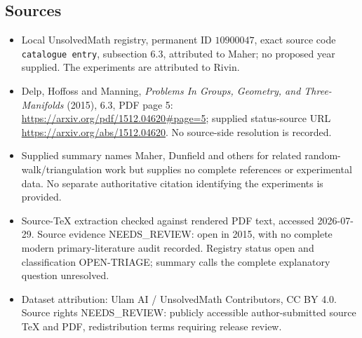 \documentclass[11pt]{article}
\begin{document}
\subsection{Sources}
\begin{itemize}
\item Local UnsolvedMath registry, permanent ID \(10900047\), exact source code \texttt{catalogue entry}, subsection 6.3, attributed to Maher; no proposed year supplied. The experiments are attributed to Rivin.
\item Delp, Hoffoss and Manning, \emph{Problems In Groups, Geometry, and Three-Manifolds} (2015), 6.3, PDF page 5: \url{https://arxiv.org/pdf/1512.04620#page=5}; supplied status-source URL \url{https://arxiv.org/abs/1512.04620}. No source-side resolution is recorded.
\item Supplied summary names Maher, Dunfield and others for related random-walk/triangulation work but supplies no complete references or experimental data. No separate authoritative citation identifying the experiments is provided.
\item Source-TeX extraction checked against rendered PDF text, accessed 2026-07-29. Source evidence NEEDS\_REVIEW: open in 2015, with no complete modern primary-literature audit recorded. Registry status open and classification OPEN-TRIAGE; summary calls the complete explanatory question unresolved.
\item Dataset attribution: Ulam AI / UnsolvedMath Contributors, CC BY 4.0. Source rights NEEDS\_REVIEW: publicly accessible author-submitted source TeX and PDF, redistribution terms requiring release review.
\end{itemize}
\end{document}
